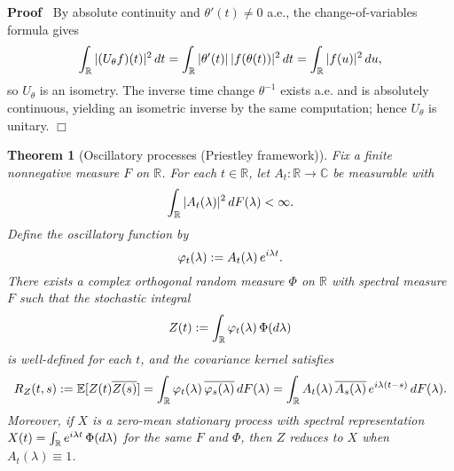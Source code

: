 \documentclass{article}
\newcommand{\assign}{:=}
\newenvironment{proof}{\noindent\textbf{Proof\ }}{\hspace*{\fill}$\Box$\medskip}
\newtheorem{theorem}{Theorem}
\begin{document}
\begin{proof}
  By absolute continuity and $\theta' (t) \neq 0$ a.e., the
  change-of-variables formula gives
  \[ \int_{\mathbb{R}} | (U_{\theta} f) (t) |^2 \hspace{0.17em} dt =
     \int_{\mathbb{R}} | \theta' (t) | \hspace{0.17em} |f (\theta (t)) |^2
     \hspace{0.17em} dt = \int_{\mathbb{R}} |f (u) |^2  \hspace{0.17em} du, \]
  so $U_{\theta}$ is an isometry. The inverse time change $\theta^{- 1}$
  exists a.e. and is absolutely continuous, yielding an isometric inverse by
  the same computation; hence $U_{\theta}$ is unitary.
\end{proof}

\begin{theorem}
  [Oscillatory processes (Priestley framework)] Fix a finite nonnegative
  measure $F$ on $\mathbb{R}$. For each $t \in \mathbb{R}$, let $A_t :
  \mathbb{R} \to \mathbb{C}$ be measurable with
  \[ \int_{\mathbb{R}} |A_t (\lambda) |^2  \hspace{0.17em} dF (\lambda) <
     \infty . \]
  Define the oscillatory function by
  \[ \varphi_t (\lambda) \assign A_t (\lambda)  \hspace{0.17em} e^{i \lambda
     t} . \]
  There exists a complex orthogonal random measure $\Phi$ on $\mathbb{R}$ with
  spectral measure $F$ such that the stochastic integral
  \[ Z (t) \assign \int_{\mathbb{R}} \varphi_t (\lambda)  \hspace{0.17em} \Phi
     (d \lambda) \]
  is well-defined for each $t$, and the covariance kernel satisfies
  \[ R_Z (t, s) \assign \mathbb{E} [Z (t) \overline{Z (s)}] =
     \int_{\mathbb{R}} \varphi_t (\lambda) \hspace{0.17em} \overline{\varphi_s
     (\lambda)} \hspace{0.17em} dF (\lambda) = \int_{\mathbb{R}} A_t (\lambda)
     \hspace{0.17em} \overline{A_s (\lambda)} \hspace{0.17em} e^{i \lambda (t
     - s)}  \hspace{0.17em} dF (\lambda) . \]
  Moreover, if $X$ is a zero-mean stationary process with spectral
  representation $X (t) = \int_{\mathbb{R}} e^{i \lambda t}  \hspace{0.17em}
  \Phi (d \lambda)$ for the same $F$ and $\Phi$, then $Z$ reduces to $X$ when
  $A_t (\lambda) \equiv 1$.
\end{theorem}
\end{document}
